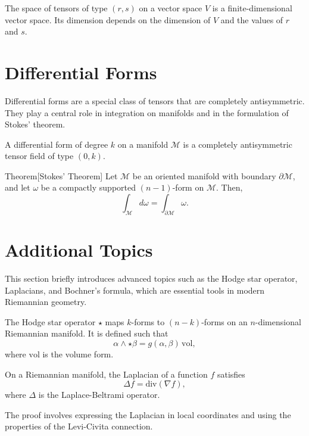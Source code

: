 \begin{proposicao}
The space of tensors of type \( (r, s) \) on a vector space \( V \) is a finite-dimensional vector space. Its dimension depends on the dimension of \( V \) and the values of \( r \) and \( s \).
\end{proposicao}

\section{Differential Forms}
Differential forms are a special class of tensors that are completely antisymmetric. They play a central role in integration on manifolds and in the formulation of Stokes' theorem.

\begin{deff}
A differential form of degree \( k \) on a manifold \( \mathcal{M} \) is a completely antisymmetric tensor field of type \( (0, k) \).
\end{deff}

\begin{namedthm}{Theorem}[Stokes' Theorem]
Let \( \mathcal{M} \) be an oriented manifold with boundary \( \partial \mathcal{M} \), and let \( \omega \) be a compactly supported \( (n-1) \)-form on \( \mathcal{M} \). Then,
\[
\int_{\mathcal{M}} d\omega = \int_{\partial \mathcal{M}} \omega.
\]
\end{namedthm}

\section{Additional Topics}
This section briefly introduces advanced topics such as the Hodge star operator, Laplacians, and Bochner's formula, which are essential tools in modern Riemannian geometry.

\begin{deff}
The Hodge star operator \( \star \) maps \( k \)-forms to \( (n-k) \)-forms on an \( n \)-dimensional Riemannian manifold. It is defined such that
\[
\alpha \wedge \star \beta = g(\alpha, \beta) \, \mathrm{vol},
\]
where \( \mathrm{vol} \) is the volume form.
\end{deff}

\begin{teorema}
On a Riemannian manifold, the Laplacian of a function \( f \) satisfies
\[
\Delta f = \text{div}(\nabla f),
\]
where \( \Delta \) is the Laplace-Beltrami operator.
\end{teorema}

\begin{demm}
The proof involves expressing the Laplacian in local coordinates and using the properties of the Levi-Civita connection.
\end{demm}